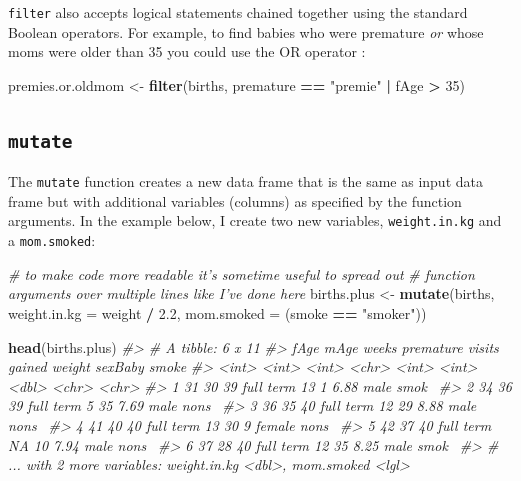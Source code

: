 \documentclass[]{book}
\newenvironment{Shaded}{\begin{snugshade}}{\end{snugshade}}
\newcommand{\CommentTok}[1]{\textcolor[rgb]{0.56,0.35,0.01}{\textit{#1}}}
\newcommand{\DataTypeTok}[1]{\textcolor[rgb]{0.13,0.29,0.53}{#1}}
\newcommand{\DecValTok}[1]{\textcolor[rgb]{0.00,0.00,0.81}{#1}}
\newcommand{\FloatTok}[1]{\textcolor[rgb]{0.00,0.00,0.81}{#1}}
\newcommand{\KeywordTok}[1]{\textcolor[rgb]{0.13,0.29,0.53}{\textbf{#1}}}
\newcommand{\NormalTok}[1]{#1}
\newcommand{\OperatorTok}[1]{\textcolor[rgb]{0.81,0.36,0.00}{\textbf{#1}}}
\newcommand{\StringTok}[1]{\textcolor[rgb]{0.31,0.60,0.02}{#1}}
\theoremstyle{definition}
\theoremstyle{definition}
\theoremstyle{definition}
\theoremstyle{remark}
\begin{document}
\texttt{filter} also accepts logical statements chained together using
the standard Boolean operators. For example, to find babies who were
premature \emph{or} whose moms were older than 35 you could use the OR
operator \texttt{\textbar{}}:

\begin{Shaded}
\begin{Highlighting}[]
\NormalTok{premies.or.oldmom <-}\StringTok{ }\KeywordTok{filter}\NormalTok{(births, premature }\OperatorTok{==}\StringTok{ "premie"} \OperatorTok{|}\StringTok{ }\NormalTok{fAge }\OperatorTok{>}\StringTok{ }\DecValTok{35}\NormalTok{)}
\end{Highlighting}
\end{Shaded}

\hypertarget{mutate}{%
\subsection{\texorpdfstring{\texttt{mutate}}{mutate}}\label{mutate}}

The \texttt{mutate} function creates a new data frame that is the same
as input data frame but with additional variables (columns) as specified
by the function arguments. In the example below, I create two new
variables, \texttt{weight.in.kg} and a \texttt{mom.smoked}:

\begin{Shaded}
\begin{Highlighting}[]
\CommentTok{# to make code more readable it's sometime useful to spread out}
\CommentTok{# function arguments over multiple lines like I've done here}
\NormalTok{births.plus <-}\StringTok{ }\KeywordTok{mutate}\NormalTok{(births, }
                      \DataTypeTok{weight.in.kg =}\NormalTok{ weight }\OperatorTok{/}\StringTok{ }\FloatTok{2.2}\NormalTok{,}
                      \DataTypeTok{mom.smoked =}\NormalTok{ (smoke }\OperatorTok{==}\StringTok{ "smoker"}\NormalTok{))}

\KeywordTok{head}\NormalTok{(births.plus)}
\CommentTok{#> # A tibble: 6 x 11}
\CommentTok{#>    fAge  mAge weeks premature visits gained weight sexBaby smoke}
\CommentTok{#>   <int> <int> <int> <chr>      <int>  <int>  <dbl> <chr>   <chr>}
\CommentTok{#> 1    31    30    39 full term     13      1   6.88 male    smok~}
\CommentTok{#> 2    34    36    39 full term      5     35   7.69 male    nons~}
\CommentTok{#> 3    36    35    40 full term     12     29   8.88 male    nons~}
\CommentTok{#> 4    41    40    40 full term     13     30   9    female  nons~}
\CommentTok{#> 5    42    37    40 full term     NA     10   7.94 male    nons~}
\CommentTok{#> 6    37    28    40 full term     12     35   8.25 male    smok~}
\CommentTok{#> # ... with 2 more variables: weight.in.kg <dbl>, mom.smoked <lgl>}
\end{Highlighting}
\end{Shaded}
\end{document}
